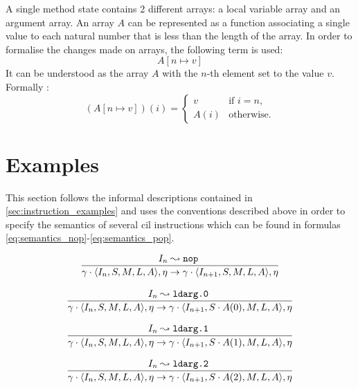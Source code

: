 \documentclass[declaration,shortabstract,english,mgr]{iithesis}
\newcommand{\mstate}[5] {
	\langle#1, #2, #3, #4, #5\rangle
}
\newcommand{\ipointsto}[3] {
	#1 \leadsto \texttt{#2} \text{ } #3
}
\newcommand{\setarrayitem}[3] {
	#1[#2 \mapsto #3]
}
\begin{document}
A single method state contains 2 different arrays: a local variable array and an argument array. An array $A$ can be represented as a function associating a single value to each natural number that is less than the length of the array. In order to formalise the changes made on arrays, the following term is used:
\begin{equation}
\label{eq:array_change}
	\setarrayitem{A}{n}{v}
\end{equation}
It can be understood as the array $A$ with the $n$-th element set to the value $v$. Formally \cite{zychlaThesis}:
\begin{equation}
\label{eq:array_change_formal}
	(\setarrayitem{A}{n}{v})(i) =
	\begin{cases}
		v		& \text{if } i = n,\\
		A(i)	& \text{otherwise.}
	\end{cases}
\end{equation}


\section{Examples}

This section follows the informal descriptions contained in \ref{sec:instruction_examples} and uses the conventions described above in order to specify the semantics of several \acrshort{cil} instructions which can be found in formulas \ref{eq:semantics_nop}-\ref{eq:semantics_pop}.

\begin{equation}
\label{eq:semantics_nop}
	\infer{
		\gamma \cdot \mstate{I_n}{S}{M}{L}{A}, \eta
			\rightarrow
		\gamma \cdot \mstate{I_{n+1}}{S}{M}{L}{A}, \eta
	}
	{\ipointsto{I_n}{nop}}
\end{equation}

\begin{equation}
\label{eq:semantics_ldarg0}
	\infer{
		\gamma \cdot \mstate{I_n}{S}{M}{L}{A}, \eta
			\rightarrow
		\gamma \cdot \mstate{I_{n+1}}{S \cdot A(0)}{M}{L}{A}, \eta
	}
	{\ipointsto{I_n}{ldarg.0}}
\end{equation}

\begin{equation}
\label{eq:semantics_ldarg1}
	\infer{
		\gamma \cdot \mstate{I_n}{S}{M}{L}{A}, \eta
			\rightarrow
		\gamma \cdot \mstate{I_{n+1}}{S \cdot A(1)}{M}{L}{A}, \eta
	}
	{\ipointsto{I_n}{ldarg.1}}
\end{equation}

\begin{equation}
\label{eq:semantics_ldarg2}
	\infer{
		\gamma \cdot \mstate{I_n}{S}{M}{L}{A}, \eta
			\rightarrow
		\gamma \cdot \mstate{I_{n+1}}{S \cdot A(2)}{M}{L}{A}, \eta
	}
	{\ipointsto{I_n}{ldarg.2}}
\end{equation}
\end{document}
